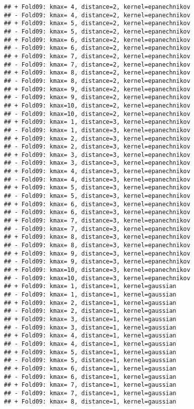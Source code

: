 \documentclass[
]{article}
\begin{document}
\begin{verbatim}
## + Fold09: kmax= 4, distance=2, kernel=epanechnikov 
## - Fold09: kmax= 4, distance=2, kernel=epanechnikov 
## + Fold09: kmax= 5, distance=2, kernel=epanechnikov 
## - Fold09: kmax= 5, distance=2, kernel=epanechnikov 
## + Fold09: kmax= 6, distance=2, kernel=epanechnikov 
## - Fold09: kmax= 6, distance=2, kernel=epanechnikov 
## + Fold09: kmax= 7, distance=2, kernel=epanechnikov 
## - Fold09: kmax= 7, distance=2, kernel=epanechnikov 
## + Fold09: kmax= 8, distance=2, kernel=epanechnikov 
## - Fold09: kmax= 8, distance=2, kernel=epanechnikov 
## + Fold09: kmax= 9, distance=2, kernel=epanechnikov 
## - Fold09: kmax= 9, distance=2, kernel=epanechnikov 
## + Fold09: kmax=10, distance=2, kernel=epanechnikov 
## - Fold09: kmax=10, distance=2, kernel=epanechnikov 
## + Fold09: kmax= 1, distance=3, kernel=epanechnikov 
## - Fold09: kmax= 1, distance=3, kernel=epanechnikov 
## + Fold09: kmax= 2, distance=3, kernel=epanechnikov 
## - Fold09: kmax= 2, distance=3, kernel=epanechnikov 
## + Fold09: kmax= 3, distance=3, kernel=epanechnikov 
## - Fold09: kmax= 3, distance=3, kernel=epanechnikov 
## + Fold09: kmax= 4, distance=3, kernel=epanechnikov 
## - Fold09: kmax= 4, distance=3, kernel=epanechnikov 
## + Fold09: kmax= 5, distance=3, kernel=epanechnikov 
## - Fold09: kmax= 5, distance=3, kernel=epanechnikov 
## + Fold09: kmax= 6, distance=3, kernel=epanechnikov 
## - Fold09: kmax= 6, distance=3, kernel=epanechnikov 
## + Fold09: kmax= 7, distance=3, kernel=epanechnikov 
## - Fold09: kmax= 7, distance=3, kernel=epanechnikov 
## + Fold09: kmax= 8, distance=3, kernel=epanechnikov 
## - Fold09: kmax= 8, distance=3, kernel=epanechnikov 
## + Fold09: kmax= 9, distance=3, kernel=epanechnikov 
## - Fold09: kmax= 9, distance=3, kernel=epanechnikov 
## + Fold09: kmax=10, distance=3, kernel=epanechnikov 
## - Fold09: kmax=10, distance=3, kernel=epanechnikov 
## + Fold09: kmax= 1, distance=1, kernel=gaussian 
## - Fold09: kmax= 1, distance=1, kernel=gaussian 
## + Fold09: kmax= 2, distance=1, kernel=gaussian 
## - Fold09: kmax= 2, distance=1, kernel=gaussian 
## + Fold09: kmax= 3, distance=1, kernel=gaussian 
## - Fold09: kmax= 3, distance=1, kernel=gaussian 
## + Fold09: kmax= 4, distance=1, kernel=gaussian 
## - Fold09: kmax= 4, distance=1, kernel=gaussian 
## + Fold09: kmax= 5, distance=1, kernel=gaussian 
## - Fold09: kmax= 5, distance=1, kernel=gaussian 
## + Fold09: kmax= 6, distance=1, kernel=gaussian 
## - Fold09: kmax= 6, distance=1, kernel=gaussian 
## + Fold09: kmax= 7, distance=1, kernel=gaussian 
## - Fold09: kmax= 7, distance=1, kernel=gaussian 
## + Fold09: kmax= 8, distance=1, kernel=gaussian 

\end{verbatim}
\end{document}
